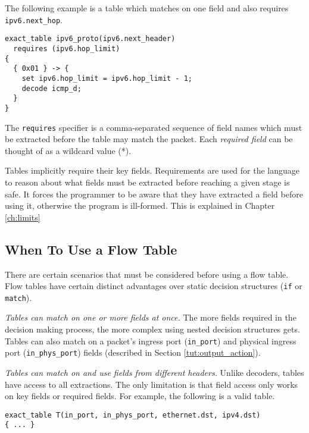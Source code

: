 The following example is a table which matches on one field and also requires
\texttt{ipv6.next\_hop}.

\begin{codepage}
\begin{lstlisting}
exact_table ipv6_proto(ipv6.next_header)
  requires (ipv6.hop_limit) 
{
  { 0x01 } -> {
  	set ipv6.hop_limit = ipv6.hop_limit - 1; 
  	decode icmp_d;
  }
}
\end{lstlisting}
\end{codepage}

The \texttt{requires} specifier is a comma-separated sequence of field names
which must be extracted before the table may match the packet.
Each \textit{required field} can be thought of as a wildcard value (*).

Tables implicitly require their key fields. 
Requirements are used for the language to reason about what
fields must be extracted before reaching a given stage is safe.
It forces the programmer to be aware that they have extracted
a field before using it, otherwise the program is ill-formed. This
is explained in Chapter \ref{ch:limits}

\subsection{When To Use a Flow Table} \label{tut:why_tables}

There are certain scenarios that must be considered before using a
flow table. Flow tables have certain distinct advantages over
static decision structures (\texttt{if} or \texttt{match}).

\textit{Tables can match on one or more fields at once.} The more fields
required in the decision making process, the more complex using nested decision
structures gets. Tables can also match on a packet's ingress port
(\texttt{in\_port}) and physical ingress port (\texttt{in\_phys\_port}) fields
(described in Section \ref{tut:output_action}).

\textit{Tables can match on and use fields from different headers.} Unlike
decoders, tables have access to all extractions. The only limitation is that
field access only works on key fields or required fields. For example, the
following is a valid table.

\begin{lstlisting}
exact_table T(in_port, in_phys_port, ethernet.dst, ipv4.dst)
{ ... }
\end{lstlisting}

